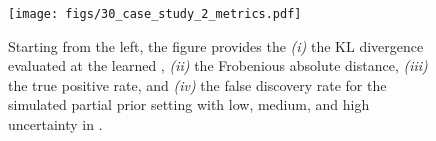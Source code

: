 \begin{figure}
    \centering
    \texttt{[image: figs/30\_case\_study\_2\_metrics.pdf]}
    \caption{Starting from the left, the figure provides the \emph{(i)} the KL divergence evaluated at the learned \Vhat, \emph{(ii)} the Frobenious absolute distance, \emph{(iii)} the true positive rate, and \emph{(iv)} the false discovery rate for the simulated partial prior setting with low, medium, and high uncertainty in .}
    \label{fig:ROIsFun_metrics}
\end{figure}
